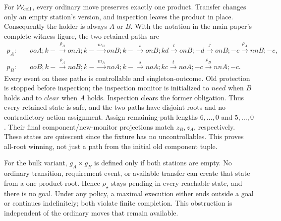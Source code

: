 \documentclass[11pt]{article}
\begin{document}
For $\mathcal W_{\rm cell}$, every ordinary move preserves exactly one product. Transfer changes only an empty station's version, and inspection leaves the product in place. Consequently the holder is always $A$ or $B$. With the notation in the main paper's complete witness figure, the two retained paths are
\begin{align*}
p_A:&\quad ooA;k-\xrightarrow{\rho_B}onA;k-
\xrightarrow{m_B}onB;k-\xrightarrow{s}onB;kd
\xrightarrow{t}onB;-d\xrightarrow{j}onB;-c
\xrightarrow{\rho_A}nnB;-c,\\
p_B:&\quad ooB;k-\xrightarrow{\rho_A}noB;k-
\xrightarrow{m_A}noA;k-\xrightarrow{s}noA;kc
\xrightarrow{t}noA;-c\xrightarrow{\rho_B}nnA;-c.
\end{align*}
Every event on these paths is controllable and singleton-outcome. Old protection is stopped before inspection; the inspection monitor is initialized to $need$ when $B$ holds and to $clear$ when $A$ holds. Inspection clears the former obligation. Thus every retained state is safe, and the two paths have disjoint roots and no contradictory action assignment. Assign remaining-path lengths $6,\ldots,0$ and $5,\ldots,0$. Their final component/new-monitor projections match $z_B,z_A$, respectively. These states are quiescent since the fixture has no uncontrollables. This proves all-root winning, not just a path from the initial old component tuple.

For the bulk variant, $g_A\times g_B$ is defined only if both stations are empty. No ordinary transition, requirement event, or available transfer can create that state from a one-product root. Hence $\rho_\star$ stays pending in every reachable state, and there is no goal. Under any policy, a maximal execution either ends outside a goal or continues indefinitely; both violate finite completion. This obstruction is independent of the ordinary moves that remain available.
\end{document}
